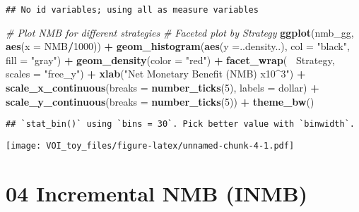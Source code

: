 \documentclass[
]{article}
\newenvironment{Shaded}{\begin{snugshade}}{\end{snugshade}}
\newcommand{\CommentTok}[1]{\textcolor[rgb]{0.56,0.35,0.01}{\textit{#1}}}
\newcommand{\DataTypeTok}[1]{\textcolor[rgb]{0.13,0.29,0.53}{#1}}
\newcommand{\DecValTok}[1]{\textcolor[rgb]{0.00,0.00,0.81}{#1}}
\newcommand{\KeywordTok}[1]{\textcolor[rgb]{0.13,0.29,0.53}{\textbf{#1}}}
\newcommand{\NormalTok}[1]{#1}
\newcommand{\OperatorTok}[1]{\textcolor[rgb]{0.81,0.36,0.00}{\textbf{#1}}}
\newcommand{\StringTok}[1]{\textcolor[rgb]{0.31,0.60,0.02}{#1}}
\begin{document}
\begin{verbatim}
## No id variables; using all as measure variables
\end{verbatim}

\begin{Shaded}
\begin{Highlighting}[]
\CommentTok{# Plot NMB for different strategies}
\CommentTok{# Faceted plot by Strategy}
\KeywordTok{ggplot}\NormalTok{(nmb_gg, }\KeywordTok{aes}\NormalTok{(}\DataTypeTok{x =}\NormalTok{ NMB}\OperatorTok{/}\DecValTok{1000}\NormalTok{)) }\OperatorTok{+}
\StringTok{  }\KeywordTok{geom_histogram}\NormalTok{(}\KeywordTok{aes}\NormalTok{(}\DataTypeTok{y =}\NormalTok{..density..), }\DataTypeTok{col =} \StringTok{"black"}\NormalTok{, }\DataTypeTok{fill =} \StringTok{"gray"}\NormalTok{) }\OperatorTok{+}
\StringTok{  }\KeywordTok{geom_density}\NormalTok{(}\DataTypeTok{color =} \StringTok{"red"}\NormalTok{) }\OperatorTok{+}
\StringTok{  }\KeywordTok{facet_wrap}\NormalTok{(}\OperatorTok{~}\StringTok{ }\NormalTok{Strategy, }\DataTypeTok{scales =} \StringTok{"free_y"}\NormalTok{) }\OperatorTok{+}
\StringTok{  }\KeywordTok{xlab}\NormalTok{(}\StringTok{"Net Monetary Benefit (NMB) x10^3"}\NormalTok{) }\OperatorTok{+}
\StringTok{  }\KeywordTok{scale_x_continuous}\NormalTok{(}\DataTypeTok{breaks =} \KeywordTok{number_ticks}\NormalTok{(}\DecValTok{5}\NormalTok{), }\DataTypeTok{labels =}\NormalTok{ dollar) }\OperatorTok{+}\StringTok{ }
\StringTok{  }\KeywordTok{scale_y_continuous}\NormalTok{(}\DataTypeTok{breaks =} \KeywordTok{number_ticks}\NormalTok{(}\DecValTok{5}\NormalTok{)) }\OperatorTok{+}\StringTok{ }
\StringTok{  }\KeywordTok{theme_bw}\NormalTok{()}
\end{Highlighting}
\end{Shaded}

\begin{verbatim}
## `stat_bin()` using `bins = 30`. Pick better value with `binwidth`.
\end{verbatim}

\texttt{[image: VOI\_toy\_files/figure-latex/unnamed-chunk-4-1.pdf]}

\hypertarget{incremental-nmb-inmb}{%
\section{04 Incremental NMB (INMB)}\label{incremental-nmb-inmb}}
\end{document}
